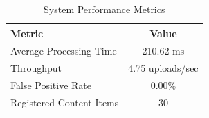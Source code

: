 
\begin{table}[h]
\centering
\caption{System Performance Metrics}
\label{tab:performance}
\begin{tabular}{lc}
\hline
\textbf{Metric} & \textbf{Value} \\
\hline
Average Processing Time & 210.62 ms \\
Throughput & 4.75 uploads/sec \\
False Positive Rate & 0.00\% \\
Registered Content Items & 30 \\
\hline
\end{tabular}
\end{table}
